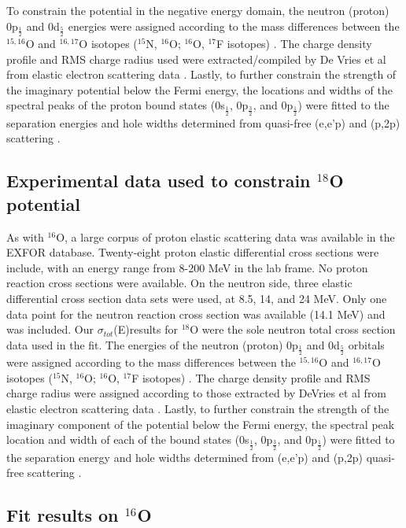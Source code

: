 \documentclass[twocolumn,secnumarabic,amssymb, nobibnotes, aps, prl,
superscriptaddress, nobalancelastpage]{revtex4}
\newcommand{\totE}{\ensuremath{\sigma_{tot}}(E)}
\begin{document}
To constrain the potential in the negative energy domain, the 
neutron (proton) 0p$_{\frac{1}{2}}$ and 0d$_{\frac{5}{2}}$ energies were
assigned according to the mass differences between the $^{15,16}$O and
$^{16,17}$O isotopes ($^{15}$N, $^{16}$O; $^{16}$O, $^{17}$F isotopes) \cite{AME2016}.
The charge density profile and RMS charge radius used were extracted/compiled by
De Vries et al from elastic electron scattering data
\cite{DeVries1987}. Lastly, to further constrain the strength of the imaginary
potential below the Fermi energy, the locations and widths of the spectral peaks
of the proton bound states (0s$_\frac{1}{2}$, 0p$_\frac{3}{2}$, and
0p$_\frac{1}{2}$) were fitted to the separation energies and hole widths determined
from quasi-free (e,e'p) and (p,2p) scattering \cite{Mougey80, Jacob66, Jacob73}.

\subsection{Experimental data used to constrain $^{18}$O potential}

As with $^{16}$O, a large corpus of proton elastic scattering data was
available in the EXFOR database. Twenty-eight proton elastic differential cross
sections were include, with an energy range from 8-200 MeV in the lab frame.
No proton reaction cross sections were available. On the neutron side, three
elastic differential cross section data sets were used, at 8.5, 14, and 24 MeV.
Only one data point for the neutron reaction cross section was available (14.1
MeV) and was included. Our \totE results for $^{18}$O were the
sole neutron total cross section data used in the fit. The energies of the
neutron (proton) 0p$_{\frac{1}{2}}$ and 0d$_{\frac{5}{2}}$ orbitals were
assigned according to the mass differences between the $^{15,16}$O and
$^{16,17}$O isotopes ($^{15}$N, $^{16}$O; $^{16}$O, $^{17}$F isotopes) \cite{AME2016}.
The charge density profile and RMS charge radius were assigned according to
those extracted by DeVries et al from elastic electron scattering data
\cite{DeVries}. Lastly, to further constrain the strength of the imaginary
component of the potential below the Fermi energy, the spectral peak location and
width of each of the bound states (0s$_\frac{1}{2}$, 0p$_\frac{3}{2}$, and
0p$_\frac{1}{2}$) were fitted to the separation energy and hole widths determined
from (e,e'p) and (p,2p) quasi-free scattering \cite{Mougey80, Jacob66, Jacob73}.

\subsection{Fit results on $^{16}$O}
\end{document}
